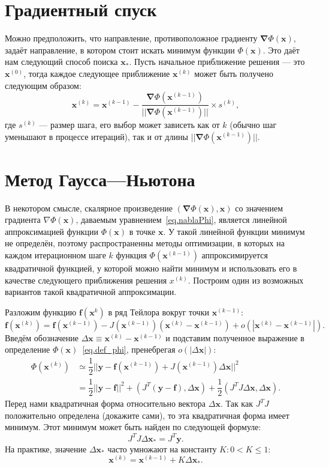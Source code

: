 \documentclass[fontsize=12pt, paper=a4]{article}
\renewcommand{\vec}[1]{\mathbf{#1}}
\def\x{\vec{x}}
\def\y{\vec{y}}
\def\f{\vec{f}}
\def\vnabla{\vec{\nabla}}
\def\m{\x_*}
\begin{document}
\section{Градиентный спуск}
Можно предположить, что направление, противоположное градиенту $\vnabla \Phi(\x)$, задаёт направление, в котором стоит искать минимум функции $\Phi(\x)$.
Это даёт нам следующий способ поиска $\m$.
Пусть начальное приближение решения — это $\x^{(0)}$, тогда каждое следующее приближение $\x^{(k)}$ может быть получено следующим образом:
\begin{equation}
\x^{(k)} = \x^{(k-1)} - \dfrac{\vnabla{\Phi(\x^{(k-1)})}}{||\vnabla{\Phi(\x^{(k-1)})}||} \times s^{(k)},
\end{equation}
где $s^{(k)}$ — размер шага, его выбор может зависеть как от $k$ (обычно шаг уменьшают в процессе итераций), так и от длины $||\vnabla{\Phi(\x^{(k-1)})}||$.


\section{Метод Гаусса---Ньютона}
В некотором смысле, скалярное произведение $(\vnabla\Phi(\x), \x)$ со значением градиента $\nabla\Phi(\x)$, даваемым уравнением~\eqref{eq.nablaPhi}, является линейной аппроксимацией функции $\Phi(\x)$ в точке $\x$.
У такой линейной функции минимум не определён, поэтому распространенны методы оптимизации, в которых на каждом итерационном шаге $k$ функция $\Phi(\x^{(k-1)})$ аппроксимируется квадратичной функцией, у которой можно найти минимум и использовать его в качестве следующего приближения решения $x^{(k)}$.
Построим один из возможных вариантов такой квадратичной аппроксимации.

Разложим функцию $\f(\x^{k})$ в ряд Тейлора вокруг точки $\x^{(k-1)}$:
\begin{equation}
\f(\x^{(k)}) = \f(\x^{(k-1)}) - J(\x^{(k-1)}) (\x^{(k)} - \x^{(k-1)}) + o(|\x^{(k)} - \x^{(k-1)}|).
\end{equation}
Введём обозначение $\Delta \x \equiv \x^{(k)} - \x^{(k-1)}$ и подставим полученное выражение в определение $\Phi(\x)$~\eqref{eq.def_phi}, пренебрегая $o(|\Delta\x|)$:
\begin{equation} \label{eq.Phi_GN}
\begin{split}
\Phi(\x^{(k)}) &\simeq \dfrac12 ||\y - \f(\x^{(k-1)}) + J(\x^{(k-1)}) \Delta\x||^2 \\
 &= \dfrac12 ||\y - \f||^2 + (J^T(\y - \f), \Delta\x) + \dfrac12 (J^TJ\Delta\x, \Delta\x).
\end{split}
\end{equation}
Перед нами квадратичная форма относительно вектора $\Delta\x$.
Так как $J^TJ$ положительно определена (докажите сами), то эта квадратичная форма имеет минимум.
Этот минимум может быть найден по следующей формуле:
\begin{equation}
J^TJ \Delta\m = J^T \y. \label{eq.Gauss_Newton}
\end{equation}
На практике, значение $\Delta\m$ часто умножают на константу $K: 0 < K \leq 1$:
\begin{equation}
\x^{(k)} = \x^{(k-1)} + K \Delta\m.
\end{equation}
\end{document}

